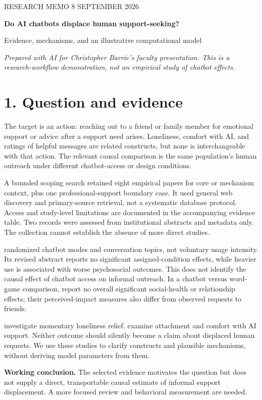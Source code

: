 \documentclass[11pt]{article}
\begin{document}
{\color{violet}\small RESEARCH MEMO \hfill 8 SEPTEMBER 2026}\par
{\LARGE\bfseries Do AI chatbots displace human support-seeking?}\par
{\large Evidence, mechanisms, and an illustrative computational model}\par
\textit{Prepared with AI for Christopher Barrie's faculty presentation. This is a research-workflow demonstration, not an empirical study of chatbot effects.}
\section*{1. Question and evidence}
The target is an action: reaching out to a friend or family member for emotional support or advice after a support need arises. Loneliness, comfort with AI, and ratings of helpful messages are related constructs, but none is interchangeable with that action. The relevant causal comparison is the same population's human outreach under different chatbot-access or design conditions.

A bounded scoping search retained eight empirical papers for core or mechanism context, plus one professional-support boundary case. It used general web discovery and primary-source retrieval, not a systematic database protocol. Access and study-level limitations are documented in the accompanying evidence table. Two records were assessed from institutional abstracts and metadata only. The collection cannot establish the absence of more direct studies.

\citet{fang2025} randomized chatbot modes and conversation topics, not voluntary usage intensity. Its revised abstract reports no significant assigned-condition effects, while heavier use is associated with worse psychosocial outcomes. This does not identify the causal effect of chatbot access on informal outreach. In a chatbot versus word-game comparison, \citet{guingrich2025} report no overall significant social-health or relationship effects; their perceived-impact measures also differ from observed requests to friends.

\citet{defreitas2025} investigate momentary loneliness relief. \citet{chandra2025} examine attachment and comfort with AI support. Neither outcome should silently become a claim about displaced human requests. We use these studies to clarify constructs and plausible mechanisms, without deriving model parameters from them.

\textbf{Working conclusion.} The selected evidence motivates the question but does not supply a direct, transportable causal estimate of informal support displacement. A more focused review and behavioral measurement are needed.
\newpage
\end{document}
